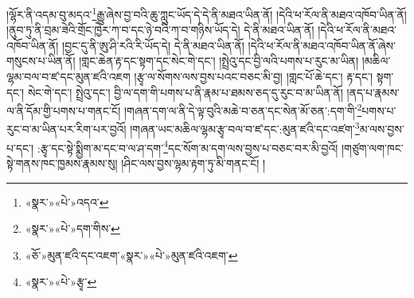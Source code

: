 །ལྷོར་ནི་འདམ་བུ་མདའ་\footnote{«སྣར་»«པེ་»འདའ་}རྒྱུ་ཞེས་བྱ་བའི་ཆུ་ཀླུང་ཡོད་དེ་དེ་ནི་མཐའ་ཡིན་ནོ། །དེའི་ཕ་རོལ་ནི་མཐའ་འཁོབ་ཡིན་ནོ། །ནུབ་ཏུ་ནི་བྲམ་ཟེའི་གྲོང་ཁྱེར་ཀ་བ་དང་ཉེ་བའི་ཀ་བ་གཉིས་ཡོད་དེ། དེ་ནི་མཐའ་ཡིན་ནོ། །དེའི་ཕ་རོལ་ནི་མཐའ་འཁོབ་ཡིན་ནོ། །བྱང་དུ་ནི་ཨུ་ཤི་རའི་རི་ཡོད་དེ། དེ་ནི་མཐའ་ཡིན་ནོ། །དེའི་ཕ་རོལ་ནི་མཐའ་འཁོབ་ཡིན་ནོ་ཞེས་གསུངས་པ་ཡིན་ནོ། །གླང་ཆེན་རྟ་དང་སྟག་དང་སེང་གེ་དང་། །སྤྲེའུ་དང་བྱི་ལའི་པགས་པ་རུང་མ་ཡིན། །མཆིལ་ལྷམ་བལ་བ་ཛ་དང་མུན་ཛའི་འཇག །རྩྭ་ལ་སོགས་ལས་བྱས་པའང་བཅང་མི་བྱ། །གླང་པོ་ཆེ་དང་། རྟ་དང་། སྟག་དང་། སེང་གེ་དང་། སྤྲེའུ་དང་། བྱི་ལ་དག་གི་པགས་པ་ནི་རྣམ་པ་ཐམས་ཅད་དུ་རུང་བ་མ་ཡིན་ནོ། །ནད་པ་རྣམས་ལ་ནི་དོམ་གྱི་པགས་པ་གནང་ངོ། །གཞན་དག་ལ་ནི་དེ་ལྟ་བུའི་མཆེ་བ་ཅན་དང་སེན་མོ་ཅན་:དག་གི་\footnote{«སྣར་»«པེ་»དག་གིས་}པགས་པ་རུང་བ་མ་ཡིན་པར་རིག་པར་བྱའོ། །གཞན་ཡང་མཆིལ་ལྷམ་རྩྭ་བལ་བ་ཛ་དང་:མུན་ཛའི་དང་འཛག་\footnote{«ཅོ་»མུན་ཛའི་དང་འཇག་«སྣར་»«པེ་»མུན་ཛའི་འཇག་}མ་ལས་བྱས་པ་དང་། :རྩྭ་དང་སྟེ་སྨྱིག་མ་དང་བ་ལ་ཤ་དག་\footnote{«སྣར་»«པེ་»རྩྭ་}དང་སོག་མ་དག་ལས་བྱས་པ་བཅང་བར་མི་བྱའོ། །གཙུག་ལག་ཁང་སྟེ་གནས་ཁང་ཁྱམས་རྣམས་སུ། །ཤིང་ལས་བྱས་ལྷམ་རྟག་ཏུ་མི་གནང་ངོ། །
